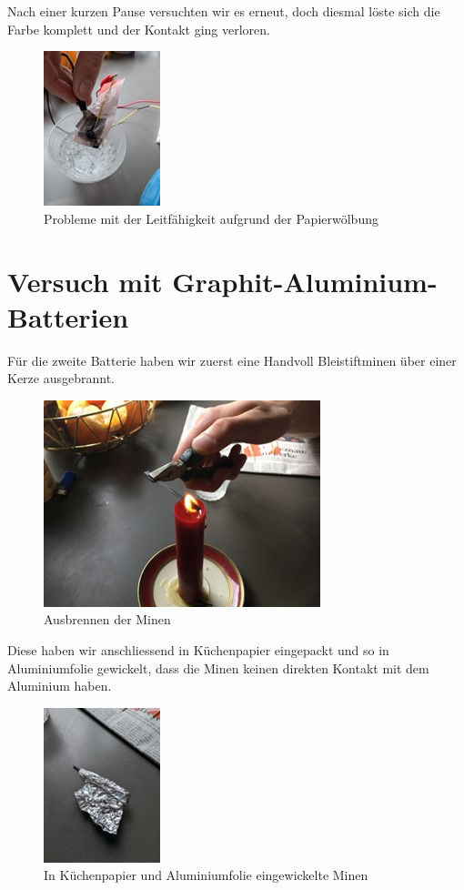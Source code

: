 \documentclass[ngerman, a4paper,12pt]{article}
\begin{document}
\newpage

\noindent Nach einer kurzen Pause versuchten wir es erneut, doch diesmal löste sich die Farbe komplett und der Kontakt ging verloren.
\begin{figure}[htbp]
	\centering
	\includegraphics[height=0.3\textheight]{Bild8.jpg}
	\caption{Probleme mit der Leitfähigkeit aufgrund der Papierwölbung}\label{fig:bild8}
\end{figure}

\section{Versuch mit Graphit-Aluminium-Batterien}

\noindent Für die zweite Batterie haben wir zuerst eine Handvoll Bleistiftminen über einer Kerze ausgebrannt.
\begin{figure}[htbp]
	\centering
	\includegraphics[height=0.3\textheight]{Bild9.jpg}
	\caption{Ausbrennen der Minen}\label{fig:bild9}
\end{figure}
\newpage

\noindent Diese haben wir anschliessend in Küchenpapier eingepackt und so in Aluminiumfolie gewickelt, dass die Minen keinen direkten Kontakt mit dem Aluminium haben.
\begin{figure}[htbp]
	\centering
	\includegraphics[height=0.3\textheight]{Bild10.jpg}
	\caption{In Küchenpapier und Aluminiumfolie eingewickelte Minen}\label{fig:bild10}
\end{figure}
\end{document}
